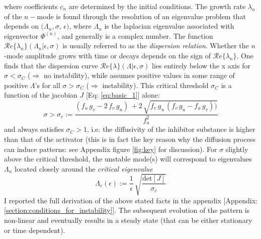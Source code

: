 where coefficients $c_n$ are determined by the initial conditions. The growth rate $\lambda_n$ of the $n-$mode is found through the resolution of an eigenvalue problem that depends on $(\Lambda_n, \sigma$, $\epsilon)$, where $\Lambda_n$ is the laplacian eigenvalue associated with eigenvector $\Phi^{(n)}$, and generally is a complex number. The function $\mathcal{R}e\{\lambda_n\} (\Lambda_n | \epsilon, \sigma)$ is usually referred to as the \textit{dispersion relation}.
Whether the $n$-mode amplitude grows with time or decays depends on the sign of $\mathcal{R}e\{\lambda_n\}$. One finds that the dispersion curve $\mathcal{R}e\{\lambda\}(\Lambda|\epsilon, \sigma)$ lies entirely below the x axis for $\sigma < \sigma_C$ ($\Rightarrow$ no instability), while assumes positive values in some range of positive $\Lambda$'s for all $\sigma > \sigma_C$ ($\Rightarrow$ instability). This critical threshold $\sigma_C$ is a function of the jacobian $J$ [Eq: \ref{eq:basic_1}] alone:
\begin{equation}
 \sigma > \sigma_c :=  \frac{(f_u\,g_v - 2\,f_v\,g_u)\, + 2\,\sqrt{f_v\,g_u\,(f_v\,g_u-f_u\,g_v))}}{f_u^2}
 \label{eq:critical_threshold}
\end{equation}
and always satisfies $\sigma_C > 1$, i.e. the diffusivity of the inhibitor substance is higher than that of the activator (this is in fact the key reason why the diffusion process can induce patterns: see Appendix figure \ref{fig:key} for discussion). \newline \noindent
For $\sigma$ slightly above the critical threshold, the unstable mode(s) will correspond to eigenvalues $\Lambda_n$ located closely around the \textit{critical eigenvalue}
\begin{equation}
    \Lambda_c(\epsilon) := \frac{1}{\epsilon}\,\sqrt{\frac{\text{det}[J]}{\sigma_c}}
    \label{eq:critical_eigenvalue}
\end{equation}
I reported the full derivation of the above stated facts in the appendix [Appendix: \ref{section:conditions_for_instability}].
The subsequent evolution of the pattern is non-linear and eventually results in a steady state (that can be either stationary or time dependent).  \bigskip \newline \noindent
